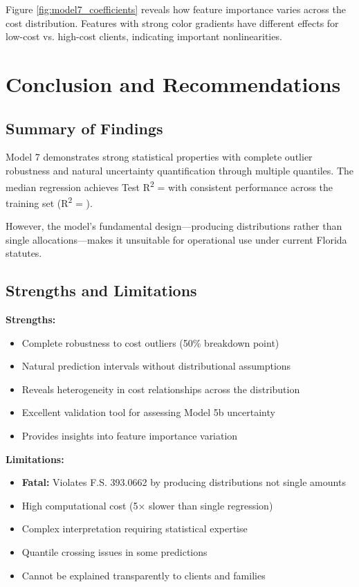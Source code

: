 Figure \ref{fig:model7_coefficients} reveals how feature importance varies across the cost distribution. Features with strong color gradients have different effects for low-cost vs. high-cost clients, indicating important nonlinearities.

\section{Conclusion and Recommendations}

\subsection{Summary of Findings}

Model 7 demonstrates strong statistical properties with complete outlier robustness and natural uncertainty quantification through multiple quantiles. The median regression achieves Test R\textsuperscript{2} = \ModelSevenRSquaredTest{} with consistent performance across the training set (R\textsuperscript{2} = \ModelSevenRSquaredTrain).

However, the model's fundamental design—producing distributions rather than single allocations—makes it unsuitable for operational use under current Florida statutes.

\subsection{Strengths and Limitations}

\textbf{Strengths:}
\begin{itemize}
\item Complete robustness to cost outliers (50\% breakdown point)
\item Natural prediction intervals without distributional assumptions
\item Reveals heterogeneity in cost relationships across the distribution
\item Excellent validation tool for assessing Model 5b uncertainty
\item Provides insights into feature importance variation
\end{itemize}

\textbf{Limitations:}
\begin{itemize}
\item \textbf{Fatal:} Violates F.S. 393.0662 by producing distributions not single amounts
\item High computational cost (5× slower than single regression)
\item Complex interpretation requiring statistical expertise
\item Quantile crossing issues in some predictions
\item Cannot be explained transparently to clients and families
\end{itemize}

